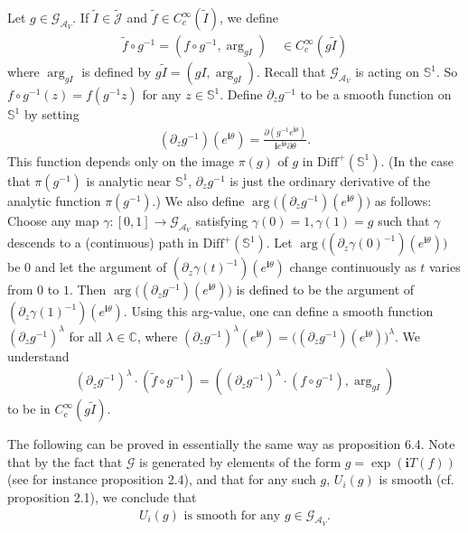 \documentclass[11pt,b5paper,notitlepage]{article}
\theoremstyle{definition}
\theoremstyle{plain}
\newcommand{\wtd}{\widetilde}
\newcommand{\Diffp}{\mathrm{Diff}^+}
\newcommand{\GAV}{\mathscr G_{\mathcal A_V}}
\newcommand{\scr}{\mathscr}
\newcommand{\Jtd}{\widetilde{\mathcal J}}
\newcommand{\im}{\mathbf{i}}
\newcommand{\mbb}{\mathbb}
\numberwithin{equation}{subsection}
\begin{document}
Let $g\in\GAV$. If $\wtd I\in\Jtd$ and $\wtd f\in C_c^\infty(\wtd I)$, we define 
\begin{align}
\wtd f\circ g^{-1}=(f\circ g^{-1},\arg_{gI})\quad \in C_c^\infty(g\wtd I)
\end{align}
where $\arg_{gI}$ is defined by $g\wtd I=(gI,\arg_{gI})$.  Recall that $\GAV$ is acting on $\mbb S^1$. So $f\circ g^{-1}(z)=f(g^{-1}z)$ for any $z\in\mbb S^1$. Define $\partial_zg^{-1}$ to be a smooth function on $\mbb S^1$ by setting
\begin{align}
(\partial_zg^{-1})(e^{\im \theta})=\frac{\partial (g^{-1}e^{\im\theta})}{\im e^{\im\theta}\partial\theta}.
\end{align}
This function depends only on the image $\pi(g)$ of $g$ in $\Diffp(\mbb S^1)$. (In the case that $\pi(g^{-1})$ is analytic near $\mbb S^1$, $\partial_zg^{-1}$ is just the ordinary derivative of the analytic function $\pi(g^{-1})$.) We also define $\arg \big((\partial_zg^{-1})(e^{\im \theta})\big)$ as follows: Choose any map  $\gamma:[0,1]\rightarrow\GAV$ satisfying $\gamma(0)=1,\gamma(1)=g$ such that $\gamma$ descends to a (continuous) path in $\Diffp(\mbb S^1)$. Let  $\arg \big((\partial_z\gamma(0)^{-1})(e^{\im \theta})\big)$ be $0$ and let the argument of $(\partial_z\gamma(t)^{-1})(e^{\im \theta})$ change continuously as $t$ varies from $0$ to $1$. Then $\arg \big((\partial_zg^{-1})(e^{\im \theta})\big)$ is defined to be the argument of $(\partial_z\gamma(1)^{-1})(e^{\im \theta})$. Using this arg-value, one can define a smooth function $(\partial_zg^{-1})^\lambda$ for all $\lambda\in\mbb C$, where $(\partial_zg^{-1})^\lambda(e^{\im\theta})=\big((\partial_zg^{-1})(e^{\im \theta})\big)^\lambda$. We understand
\begin{align*}
(\partial_zg^{-1})^\lambda\cdot  (\wtd f\circ g^{-1})=((\partial_zg^{-1})^\lambda\cdot(f\circ g^{-1}),\arg_{gI})
\end{align*}
to be in $C_c^\infty(g\wtd I)$. 

The following can be proved in essentially the same way as \cite{CKLW18} proposition 6.4. Note that  by the fact that $\scr G$ is generated by elements of the form $g=\exp(\im T(f))$ (see for instance \cite{Gui21a} proposition 2.4), and that for any such $g$, $U_i(g)$ is smooth (cf. \cite{TL99} proposition 2.1), we conclude that %
\begin{align}\label{eq51}
\text{$U_i(g)$ is smooth for any $g\in\GAV$}.
\end{align}
\end{document}
